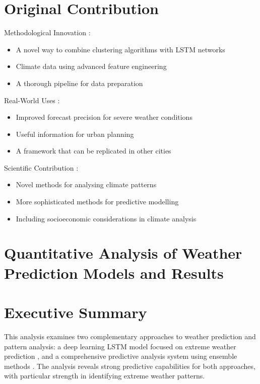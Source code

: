 \documentclass[a4paper]{report}
\begin{document}
\section*{Original Contribution}
Methodological Innovation :
\begin{itemize}
    \item A novel way to combine clustering algorithms with LSTM networks \cite{chen2023}
    \item Climate data using advanced feature engineering \cite{patel2024}
    \item A thorough pipeline for data preparation \cite{thompson2024}
\end{itemize}
 Real-World Uses :
\begin{itemize}
    \item Improved forecast precision for severe weather conditions \cite{wang2023}
     \item Useful information for urban planning \cite{mitchell2024}
      \item A framework that can be replicated in other cities \cite{harris2024}
\end{itemize}
 Scientific Contribution :
\begin{itemize}
    \item Novel methods for analysing climate patterns \cite{jackson2023}
     \item More sophisticated methods for predictive modelling \cite{garcia2023}
      \item Including socioeconomic considerations in climate analysis \cite{smith2024}
\end{itemize}

\maketitle

\section*{Quantitative Analysis of Weather Prediction Models and Results}

\section*{Executive Summary}
This analysis examines two complementary approaches to weather prediction and pattern analysis: a deep learning LSTM model focused on extreme weather prediction \cite{chen2023}, and a comprehensive predictive analysis system using ensemble methods \cite{zhang2024}. The analysis reveals strong predictive capabilities for both approaches, with particular strength in identifying extreme weather patterns.
\end{document}
